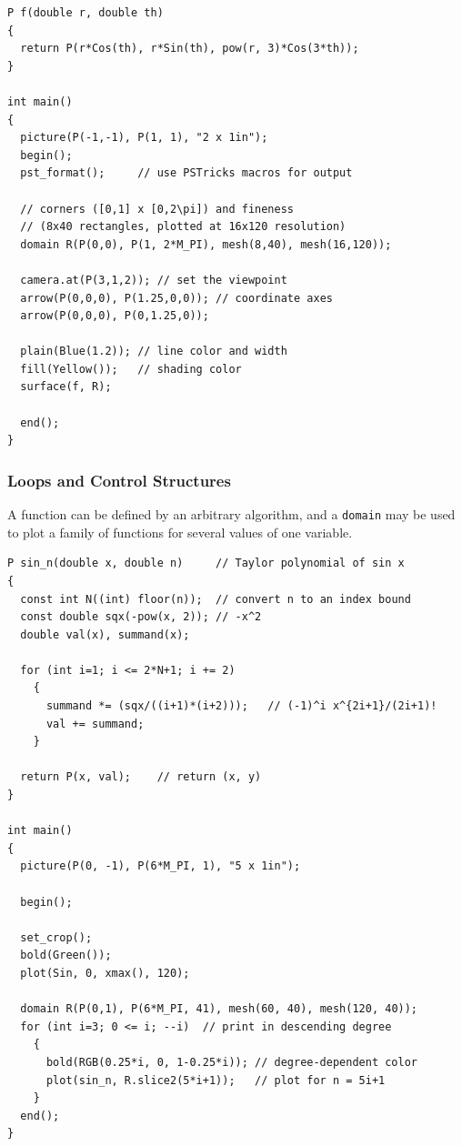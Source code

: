 \documentclass[12pt,letterpaper]{book}
\newcommand{\code}[1]{\texttt{#1}}
\begin{document}
\begin{verbatim}
P f(double r, double th)
{
  return P(r*Cos(th), r*Sin(th), pow(r, 3)*Cos(3*th));
}

int main()
{
  picture(P(-1,-1), P(1, 1), "2 x 1in");
  begin();
  pst_format();     // use PSTricks macros for output

  // corners ([0,1] x [0,2\pi]) and fineness
  // (8x40 rectangles, plotted at 16x120 resolution)
  domain R(P(0,0), P(1, 2*M_PI), mesh(8,40), mesh(16,120));

  camera.at(P(3,1,2)); // set the viewpoint
  arrow(P(0,0,0), P(1.25,0,0)); // coordinate axes
  arrow(P(0,0,0), P(0,1.25,0));

  plain(Blue(1.2)); // line color and width
  fill(Yellow());   // shading color
  surface(f, R);

  end();
}
\end{verbatim}

\begin{center}
  
\end{center}


\subsubsection*{Loops and Control Structures}
\label{taylor_poly}

A function can be defined by an arbitrary algorithm, and a
\code{domain} may be used to plot a family of functions for several
values of one variable.

\begin{footnotesize}
\begin{verbatim}
P sin_n(double x, double n)     // Taylor polynomial of sin x
{
  const int N((int) floor(n));  // convert n to an index bound
  const double sqx(-pow(x, 2)); // -x^2
  double val(x), summand(x);

  for (int i=1; i <= 2*N+1; i += 2)
    {
      summand *= (sqx/((i+1)*(i+2)));   // (-1)^i x^{2i+1}/(2i+1)!
      val += summand;
    }

  return P(x, val);    // return (x, y)
}

int main()
{
  picture(P(0, -1), P(6*M_PI, 1), "5 x 1in");

  begin();

  set_crop();
  bold(Green());
  plot(Sin, 0, xmax(), 120);

  domain R(P(0,1), P(6*M_PI, 41), mesh(60, 40), mesh(120, 40));
  for (int i=3; 0 <= i; --i)  // print in descending degree
    {
      bold(RGB(0.25*i, 0, 1-0.25*i)); // degree-dependent color
      plot(sin_n, R.slice2(5*i+1));   // plot for n = 5i+1
    }
  end();
}
\end{verbatim}
\end{footnotesize}
\end{document}
